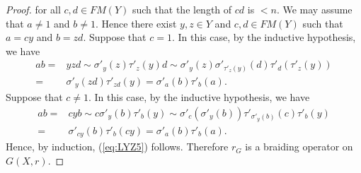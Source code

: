\begin{proof}
for all $c,d\in FM(Y)$ such that the length of $cd$ is $<n$. We may assume that $a\neq 1$ and $b\neq 1$. Hence there exist $y,z\in Y$ and $c,d\in FM(Y)$ such that $a=cy$ and $b=zd$. Suppose that $c=1$. In this case, by the inductive hypothesis, we have
\begin{align*}ab=&yzd\sim \sigma'_y(z)\tau'_z(y)d\sim \sigma'_y(z)\sigma'_{\tau'_z(y)}(d)\tau'_d(\tau'_z(y))\\
=&\sigma'_y(zd)\tau'_{zd}(y)=\sigma'_a(b)\tau'_b(a).
\end{align*}
Suppose that $c\neq 1$. In this case, by the inductive hypothesis, we have 
\begin{align*} ab=& cyb\sim c\sigma'_y(b)\tau'_b(y)\sim \sigma'_c(\sigma'_y(b))\tau'_{\sigma'_{y}(b)}(c)\tau'_{b}(y)\\
=&\sigma'_{cy}(b)\tau'_{b}(cy)=\sigma'_a(b)\tau'_b(a).
\end{align*}
Hence, by induction, (\ref{eq:LYZ5}) follows. Therefore $r_G$ is a braiding operator on $G(X,r)$.


\end{proof}

